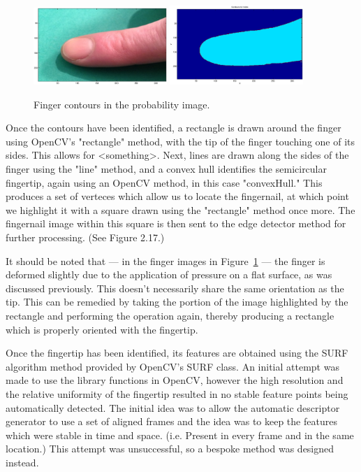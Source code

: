 \begin{figure}[h!]
  \centering
      \includegraphics[width=0.45\textwidth]{Chapter2/Figs/imgJIndex1.eps}
    \includegraphics[width=0.45\textwidth]{Chapter2/Figs/indexContours.eps}
    \caption{Finger contours in the probability image.}\label{fig:IndexContours}
\end{figure}

Once the contours have been identified, a rectangle is drawn around the finger using OpenCV's "rectangle" method, with the tip of the finger touching one of its sides. This allows for <something>. Next, lines are drawn along the sides of the finger using the "line" method, and a convex hull identifies the semicircular fingertip, again using an OpenCV method, in this case "convexHull." This produces a set of verteces which allow us to locate the fingernail, at which point we highlight it with a square drawn using the "rectangle" method once more. The fingernail image within this square is then sent to the edge detector method for further processing. (See Figure 2.17.)

It should be noted that --- in the finger images in Figure~\ref{fig:IndexContours} --- the finger is deformed slightly due to the application of pressure on a flat surface, as was discussed previously. This doesn't necessarily share the same orientation as the tip. This can be remedied by taking the portion of the image highlighted by the rectangle and performing the operation again, thereby producing a rectangle which is properly oriented with the fingertip.

Once the fingertip has been identified, its features are obtained using the SURF algorithm method provided by OpenCV's SURF class. An initial attempt was made to use the library functions in OpenCV, however the high resolution and the relative uniformity of the fingertip resulted in no stable feature points being automatically detected. The initial idea was to allow the automatic descriptor generator to use a set of aligned frames and the idea was to keep the features which were stable in time and space. (i.e. Present in every frame and in the same location.) This attempt was unsuccessful, so a bespoke method was designed instead.

